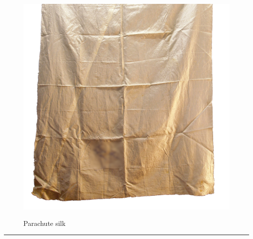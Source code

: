 \documentclass{article}
\begin{document}
    \begin{figure}[H]
        \centering
        \begin{minipage}{0.25\textwidth}
            \centering
            \includegraphics[width=\textwidth]{../SurvivalItemImages/silk}
        \end{minipage}\hfill
        \begin{minipage}{0.7\textwidth}
            \centering
            \Large Parachute silk
        \end{minipage}
    \end{figure}
    \vspace{-0.8em}
    \noindent\rule{\textwidth}{0.4pt}
            
\end{document}

